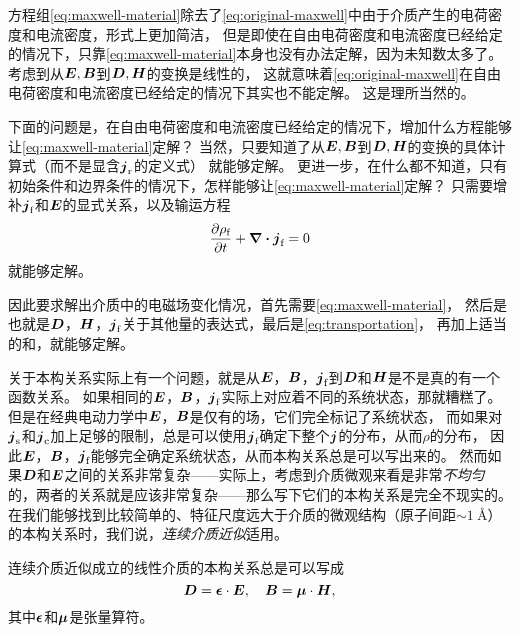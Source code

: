 方程组\eqref{eq:maxwell-material}除去了\eqref{eq:original-maxwell}中由于介质产生的电荷密度和电流密度，形式上更加简洁，
但是即使在自由电荷密度和电流密度已经给定的情况下，只靠\eqref{eq:maxwell-material}本身也没有办法定解，因为未知数太多了。
考虑到从$\vb*{E}, \vb*{B}$到$\vb*{D}, \vb*{H}$的变换是线性的，
这就意味着\eqref{eq:original-maxwell}在自由电荷密度和电流密度已经给定的情况下其实也不能定解。
这是理所当然的。

下面的问题是，在自由电荷密度和电流密度已经给定的情况下，增加什么方程能够让\eqref{eq:maxwell-material}定解？
当然，只要知道了从$\vb*{E}, \vb*{B}$到$\vb*{D}, \vb*{H}$的变换的具体计算式（而不是显含$\vb*{j}_\text{r}$的定义式）
就能够定解。
更进一步，在什么都不知道，只有初始条件和边界条件的情况下，怎样能够让\eqref{eq:maxwell-material}定解？
只需要增补$\vb*{j}_\text{f}$和$\vb*{E}$的显式关系，以及输运方程
\begin{equation}
    \pdv{\rho_\text{f}}{t} + \div{\vb*{j}_\text{f}} = 0
    \label{eq:transportation}
\end{equation}
就能够定解。

因此要求解出介质中的电磁场变化情况，首先需要\eqref{eq:maxwell-material}，
然后是也就是$\vb*{D}$，$\vb*{H}$，$\vb*{j}_\text{f}$关于其他量的表达式，最后是\eqref{eq:transportation}，
再加上适当的和，就能够定解。

关于本构关系实际上有一个问题，就是从$\vb*{E}$，$\vb*{B}$，$\vb*{j}_\text{f}$到$\vb*{D}$和$\vb*{H}$是不是真的有一个函数关系。
如果相同的$\vb*{E}$，$\vb*{B}$，$\vb*{j}_\text{f}$实际上对应着不同的系统状态，那就糟糕了。
但是在经典电动力学中$\vb*{E}$，$\vb*{B}$是仅有的场，它们完全标记了系统状态，
而如果对$\vb*{j}_\text{s}$和$\vb*{j}_\text{c}$加上足够的限制，总是可以使用$\vb*{j}_\text{f}$确定下整个$\vb*{j}$的分布，从而$\rho$的分布，
因此$\vb*{E}$，$\vb*{B}$，$\vb*{j}_\text{f}$能够完全确定系统状态，从而本构关系总是可以写出来的。
然而如果$\vb*{D}$和$\vb*{E}$之间的关系非常复杂——实际上，考虑到介质微观来看是非常\emph{不均匀}的，两者的关系就是应该非常复杂——那么写下它们的本构关系是完全不现实的。
在我们能够找到比较简单的、特征尺度远大于介质的微观结构（原子间距$\sim \SI{1}{\angstrom}$）的本构关系时，我们说，\emph{连续介质近似}适用。

连续介质近似成立的线性介质的本构关系总是可以写成
\begin{equation}
    \vb*{D} = \vb*{\epsilon} \cdot \vb*{E}, \quad \vb*{B} = \vb*{\mu} \cdot \vb*{H},
\end{equation}
其中$\vb*{\epsilon}$和$\vb*{\mu}$是张量算符。

